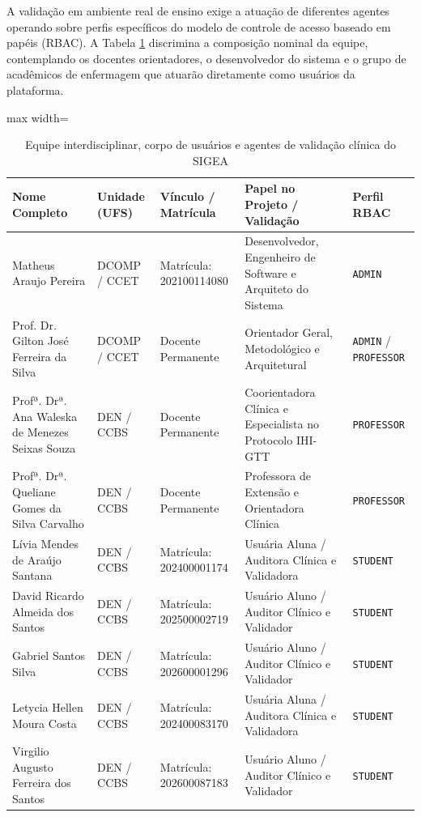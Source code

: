 A validação em ambiente real de ensino exige a atuação de diferentes agentes operando sobre perfis específicos do modelo de controle de acesso baseado em papéis (RBAC). A Tabela \ref{tab:equipe-validacao} discrimina a composição nominal da equipe, contemplando os docentes orientadores, o desenvolvedor do sistema e o grupo de acadêmicos de enfermagem que atuarão diretamente como usuários da plataforma.

\begin{table}[htbp]
\centering
\small
\caption{Equipe interdisciplinar, corpo de usuários e agentes de validação clínica do SIGEA}
\label{tab:equipe-validacao}
\begin{adjustbox}{max width=\textwidth}
\begin{tabular}{>{\raggedright\arraybackslash}p{4.2cm} >{\raggedright\arraybackslash}p{2.3cm} >{\raggedright\arraybackslash}p{2.9cm} >{\raggedright\arraybackslash}p{5.1cm} >{\centering\arraybackslash}p{1.9cm}}
\toprule
\textbf{Nome Completo} & \textbf{Unidade (UFS)} & \textbf{Vínculo / Matrícula} & \textbf{Papel no Projeto / Validação} & \textbf{Perfil RBAC} \\
\midrule
Matheus Araujo Pereira & DCOMP / CCET & Matrícula: 202100114080 & Desenvolvedor, Engenheiro de Software e Arquiteto do Sistema & \texttt{ADMIN} \\
\midrule
Prof. Dr. Gilton José Ferreira da Silva & DCOMP / CCET & Docente Permanente & Orientador Geral, Metodológico e Arquitetural & \texttt{ADMIN} / \texttt{PROFESSOR} \\
\midrule
Profª. Drª. Ana Waleska de Menezes Seixas Souza & DEN / CCBS & Docente Permanente & Coorientadora Clínica e Especialista no Protocolo IHI-GTT & \texttt{PROFESSOR} \\
\midrule
Profª. Drª. Queliane Gomes da Silva Carvalho & DEN / CCBS & Docente Permanente & Professora de Extensão e Orientadora Clínica & \texttt{PROFESSOR} \\
\midrule
Lívia Mendes de Araújo Santana & DEN / CCBS & Matrícula: 202400001174 & Usuária Aluna / Auditora Clínica e Validadora & \texttt{STUDENT} \\
David Ricardo Almeida dos Santos & DEN / CCBS & Matrícula: 202500002719 & Usuário Aluno / Auditor Clínico e Validador & \texttt{STUDENT} \\
Gabriel Santos Silva & DEN / CCBS & Matrícula: 202600001296 & Usuário Aluno / Auditor Clínico e Validador & \texttt{STUDENT} \\
Letycia Hellen Moura Costa & DEN / CCBS & Matrícula: 202400083170 & Usuária Aluna / Auditora Clínica e Validadora & \texttt{STUDENT} \\
Virgilio Augusto Ferreira dos Santos & DEN / CCBS & Matrícula: 202600087183 & Usuário Aluno / Auditor Clínico e Validador & \texttt{STUDENT} \\
\bottomrule
\end{tabular}
\end{adjustbox}
\end{table}

